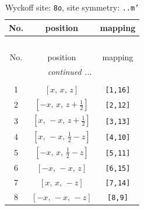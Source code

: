 \documentclass[fleqn,8pt]{jsarticle}
\begin{document}
\begin{longtable}{ccc}
\caption{Wyckoff site: {\tt 8o}, site symmetry: {\tt ..m'}}
 \\
 \hline \hline
No. & position & mapping \\ \hline \endfirsthead

\multicolumn{2}{l}{\tablename\ \thetable{}} \\
 \hline \hline
No. & position & mapping \\ \hline \endhead

 \hline \hline
\multicolumn{2}{r}{\footnotesize\it continued ...} \\ \endfoot

 \hline \hline
\multicolumn{2}{r}{} \\ \endlastfoot

1 & $\left[ x,\, x,\, z \right]$ & {\tt [1,16]} \\ \hline
2 & $\left[ - x,\, x,\, z + \frac{1}{2} \right]$ & {\tt [2,12]} \\ \hline
3 & $\left[ x,\, - x,\, z + \frac{1}{2} \right]$ & {\tt [3,13]} \\ \hline
4 & $\left[ x,\, - x,\, \frac{1}{2} - z \right]$ & {\tt [4,10]} \\ \hline
5 & $\left[ - x,\, x,\, \frac{1}{2} - z \right]$ & {\tt [5,11]} \\ \hline
6 & $\left[ - x,\, - x,\, z \right]$ & {\tt [6,15]} \\ \hline
7 & $\left[ x,\, x,\, - z \right]$ & {\tt [7,14]} \\ \hline
8 & $\left[ - x,\, - x,\, - z \right]$ & {\tt [8,9]} \\
\end{longtable}
\renewcommand{\arraystretch}{1.2}
\end{document}
